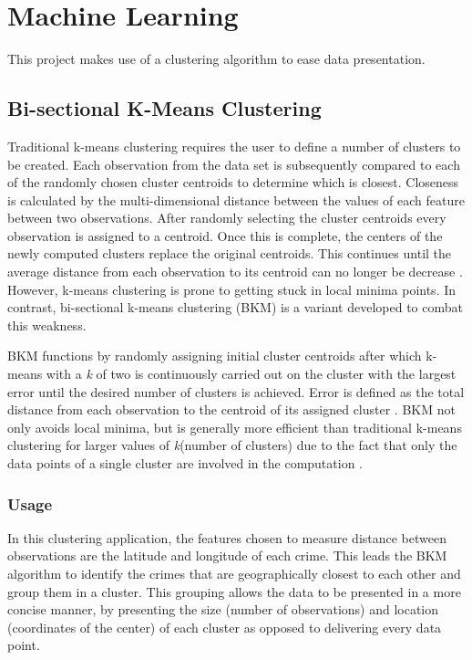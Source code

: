\documentclass[main.tex]{subfiles}
\begin{document}
\section{Machine Learning}
This project makes use of a clustering algorithm to ease data presentation.

\subsection*{Bi-sectional K-Means Clustering}
Traditional k-means clustering requires the user to define a number of clusters to be created. Each observation from the data set is subsequently compared to each of the randomly chosen cluster centroids to determine which is closest. Closeness is calculated by the multi-dimensional distance between the values of each feature between two observations. After randomly selecting the cluster centroids every observation is assigned to a centroid. Once this is complete, the centers of the newly computed clusters replace the original centroids. This continues until the average distance from each observation to its centroid can no longer be decrease \cite{kMeans}. However, k-means clustering is prone to getting stuck in local minima points. In contrast, bi-sectional k-means clustering (BKM) is a variant developed to combat this weakness.

BKM functions by randomly assigning initial cluster centroids after which k-means with a \textit{k} of two is continuously carried out on the cluster with the largest error until the desired number of clusters is achieved. Error is defined as the total distance from each observation to the centroid of its assigned cluster \cite{bkmGeneral}. BKM not only avoids local minima, but is generally more efficient than traditional k-means clustering for larger values of \textit{k}(number of clusters) due to the fact that only the data points of a single cluster are involved in the computation  \cite{bkmGood}.

\subsubsection*{Usage}
In this clustering application, the features chosen to measure distance between observations are the latitude and longitude of each crime. This leads the BKM algorithm to identify the crimes that are geographically closest to each other and group them in a cluster. This grouping allows the data to be presented in a more concise manner, by presenting the size (number of observations) and location (coordinates of the center) of each cluster as opposed to delivering every data point. 
\end{document}
